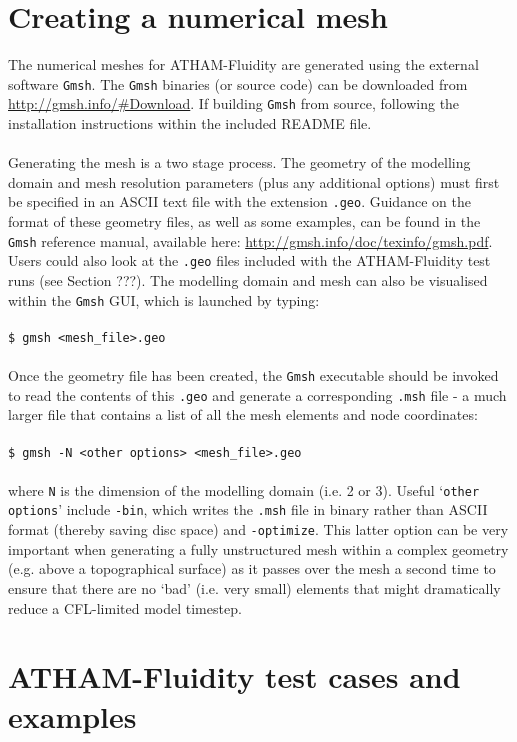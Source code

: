 \documentclass[10pt,a4paper]{article}
\newcommand\tab[1][0.5cm]{\hspace*{#1}}
\begin{document}
\section{Creating a numerical mesh} \label{Mesh}
The numerical meshes for ATHAM-Fluidity are generated using the external software \texttt{Gmsh}. The \texttt{Gmsh} binaries (or source code) can be downloaded from \url{http://gmsh.info/#Download}. If building \texttt{Gmsh} from source, following the installation instructions within the included README file.\\\\
Generating the mesh is a two stage process. The geometry of the modelling domain and mesh resolution parameters (plus any additional options) must first be specified in an ASCII text file with the extension \texttt{.geo}. Guidance on the format of these geometry files, as well as some examples, can be found in the \texttt{Gmsh} reference manual, available here: \url{http://gmsh.info/doc/texinfo/gmsh.pdf}. Users could also look at the \texttt{.geo} files included with the ATHAM-Fluidity test runs (see Section ???). The modelling domain and mesh can also be visualised within the \texttt{Gmsh} GUI, which is launched by typing:\\\\
\tab \texttt{\$ gmsh <mesh\_file>.geo}\\\\
Once the geometry file has been created, the \texttt{Gmsh} executable should be invoked to read the contents of this \texttt{.geo} and generate a corresponding \texttt{.msh} file - a much larger file that contains a list of all the mesh elements and node coordinates:\\\\
\tab \texttt{\$ gmsh -N <other options> <mesh\_file>.geo}\\\\
where \texttt{N} is the dimension of the modelling domain (i.e. 2 or 3). Useful `\texttt{other options}' include \texttt{-bin}, which writes the \texttt{.msh} file in binary rather than ASCII format (thereby saving disc space) and \texttt{-optimize}. This latter option can be very important when generating a fully unstructured mesh within a complex geometry (e.g. above a topographical surface) as it passes over the mesh a second time to ensure that there are no `bad' (i.e. very small) elements that might dramatically reduce a CFL-limited model timestep.

\section{ATHAM-Fluidity test cases and examples} \label{Tests}
\end{document}
